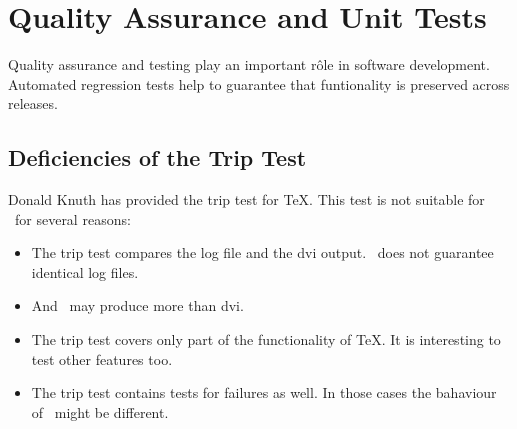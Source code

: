 \chapter{Quality Assurance and Unit Tests}\label{chapter:testing}

Quality assurance and testing play an important r\^ole in software
development. Automated regression tests help to guarantee that
funtionality is preserved across releases.


\section{Deficiencies of the Trip Test}

Donald Knuth has provided the trip test for \TeX. This test is not
suitable for \ExTeX\ for several reasons:
\begin{itemize}
\item The trip test compares the log file and the dvi output. \ExTeX\
  does not guarantee identical log files.
\item And \ExTeX\ may produce more than dvi.
\item The trip test covers only part of the functionality of \TeX. It
  is interesting to test other features too.
\item The trip test contains tests for failures as well. In those
  cases the bahaviour of \ExTeX\ might be different.
\end{itemize}

